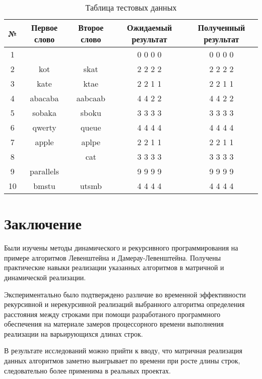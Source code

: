 \documentclass[12pt]{report}
\begin{document}
\begin{table} [H]
\caption{Таблица тестовых данных}
	\begin{tabular}{|c c c c c|} 
 	\hline
	№ & Первое слово & Второе слово & Ожидаемый результат & Полученный результат \\ [0.8ex] 
 	\hline\hline
 	1 &  &  & 0 0 0 0 & 0 0 0 0\\
 	\hline
 	2 & kot & skat & 2 2 2 2 & 2 2 2 2\\
 	\hline
	3 & kate & ktae & 2 2 1 1 & 2 2 1 1\\
	\hline
	4 & abacaba & aabcaab & 4 4 2 2 & 4 4 2 2\\
	\hline
	5 & sobaka & sboku & 3 3 3 3 & 3 3 3 3\\
	\hline
	6 & qwerty & queue & 4 4 4 4 & 4 4 4 4\\
	\hline
	7 & apple & aplpe & 2 2 1 1  & 2 2 1 1\\
	\hline
	8 &  & cat & 3 3 3 3 & 3 3 3 3\\
	\hline
	9 & parallels &  & 9 9 9 9 & 9 9 9 9\\
	\hline
	10 & bmstu & utsmb & 4 4 4 4 & 4 4 4 4\\
	\hline
	\end{tabular}
\end{table}



\chapter*{Заключение}
Были изучены методы динамического и рекурсивного программирования на примере алгоритмов Левенштейна и Дамерау-Левенштейна.
Получены практические навыки реализации указанных алгоритмов в матричной и динамической реализации.

Экспериментально было подтверждено различие во временной эффективности рекурсивной и нерекурсивной реализаций выбранного алгоритма определения расстояния между строками при помощи разработаного программного обеспечения на материале замеров процессорного времени выполнения реализации на варьирующихся длинах строк. 

В результате исследований можно прийти к вводу, что матричная реализация данных алгоритмов заметно выигрывает по времени при росте длины строк, следовательно более применима в реальных проектах.
\end{document}
